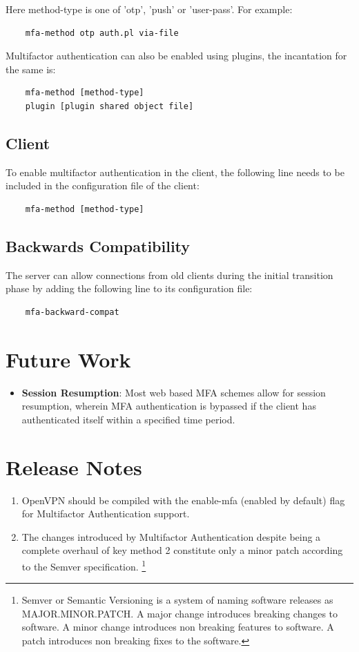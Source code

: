 \documentclass[11pt,oneside]{book}
\begin{document}
\noindent Here method-type is one of 'otp', 'push' or 'user-pass'. For example:
\begin{verbatim}
    mfa-method otp auth.pl via-file
\end{verbatim}

\noindent Multifactor authentication can also be enabled using plugins, the incantation for the same is:
\begin{verbatim}
    mfa-method [method-type]
    plugin [plugin shared object file]
\end{verbatim}

\subsection{Client}
To enable multifactor authentication in the client, the following line needs to be included in the
configuration file of the client:

\begin{verbatim}
    mfa-method [method-type]
\end{verbatim}

\subsection{Backwards Compatibility}
\label{MFA:BackwardCompat}
The server can allow connections from old clients during the initial transition phase by adding
the following line to its configuration file:

\begin{verbatim}
    mfa-backward-compat
\end{verbatim}

\section{Future Work}
\begin{itemize}
    \item \textbf{Session Resumption}: Most web based MFA schemes allow for session resumption,
        wherein MFA authentication is bypassed if the client has authenticated itself within
        a specified time period.
\end{itemize}

\section{Release Notes}
\begin{enumerate}
    \item OpenVPN should be compiled with the enable-mfa (enabled by default) flag for Multifactor
        Authentication support.
    \item The changes introduced by Multifactor Authentication despite being a complete overhaul of key method
          2 constitute only a minor patch according to the Semver specification. \footnote{Semver or Semantic
          Versioning is a system of naming software releases as MAJOR.MINOR.PATCH. A major change introduces
          breaking changes to software. A minor change introduces non breaking features to software.
          A patch introduces non breaking fixes to the software.}
\end{enumerate}
\end{document}
